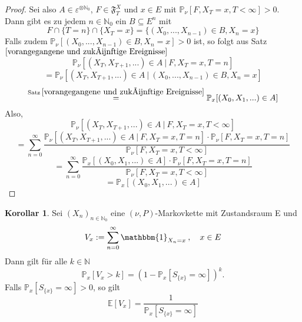 \documentclass[a4paper,12pt]{scrartcl}
\theoremstyle{definition}
\newtheorem{kol}{Korollar}[section]
\begin{document}
\begin{proof}
Sei also $ A \in \varepsilon^{ \otimes \mathbb{N}_{0}}$, $F \in \mathfrak{F}_{T}^{X}$ und $x \in E$ mit $\mathbb{P}_{\nu}[F, X_{T} = x, T < \infty] > 0$. Dann gibt es zu jedem $n \in \mathbb{N}_{0}$ ein $B \subseteq E^{n}$ mit
\begin{equation*}
F \cap \lbrace T = n \rbrace \cap \lbrace X_{T} = x \rbrace = \lbrace (X_{0},...,X_{n-1}) \in B, X_{n} = x \rbrace
\end{equation*}
Falls zudem $\mathbb{P}_{\nu}[(X_{0},...,X_{n-1}) \in B, X_{n} = x] > 0$ ist, so folgt aus Satz $\ref{vorangegangene und zukünftige Ereignisse}$
\begin{equation*}
\mathbb{P}_{\nu}[(X_{T},X_{T+1},...) \in A \: | \: F, X_{T} = x, T = n]
\end{equation*}
\begin{equation*}
= \mathbb{P}_{\nu}[(X_{T},X_{T+1},...) \in A \: | \: (X_{0},...,X_{n-1}) \in B, X_{n} = x]
\end{equation*}
\begin{equation*}
\stackrel{\mathrm{Satz} \: \ref{vorangegangene und zukünftige Ereignisse}}{=} \mathbb{P}_{x}[(X_{0},X_{1},...) \in A]
\end{equation*}
Also,
\begin{equation*}
\mathbb{P}_{\nu}[(X_{T},X_{T+1},...) \in A \: | \: F, X_{T} = x, T < \infty]
\end{equation*}
\begin{equation*}
= \sum_{n=0}^{\infty} \dfrac{\mathbb{P}_{\nu}[(X_{T},X_{T+1},...) \in A \: | \: F, X_{T} = x, T = n] \cdot \mathbb{P}_{\nu}[F, X_{T} = x, T = n]}{ \mathbb{P}_{\nu}[F, X_{T} = x, T < \infty]} 
\end{equation*}
\begin{equation*}
= \sum_{n=0}^{\infty} \dfrac{\mathbb{P}_{x}[(X_{0},X_{1},...) \in A] \cdot \mathbb{P}_{\nu}[F, X_{T} = x, T = n]}{ \mathbb{P}_{\nu}[F, X_{T} = x, T < \infty]} 
\end{equation*}
\begin{equation*}
= \mathbb{P}_{x}[(X_{0},X_{1},...) \in A]
\end{equation*}
\end{proof}
\begin{kol}
\label{Anzahl Besuche}
Sei $(X_{n})_{n \in \mathbb{N}_{0}}$ eine $(\nu,P)$-Markovkette mit Zustandsraum E und 
\begin{equation*}
V_{x} := \sum_{n=0}^{\infty} \mathbbm{1}_{X_{n} = x} \: , \quad x \in E
\end{equation*}
Dann gilt für alle $k \in \mathbb{N}$ 
\begin{equation*}
\mathbb{P}_{x}[V_{x} > k] = (1-\mathbb{P}_{x}[S_{\lbrace x \rbrace} = \infty] )^{k}.
\end{equation*}
Falls $\mathbb{P}_{x}[S_{\lbrace x \rbrace} = \infty] > 0$, so gilt
\begin{equation*}
\mathbb{E}[V_{x}] = \dfrac{1}{\mathbb{P}_{x}[S_{\lbrace x \rbrace} = \infty]}
\end{equation*}
\end{kol}
\end{document}
